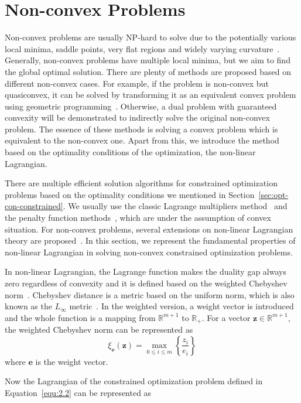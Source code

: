 \section{Non-convex Problems}
\label{sec:non-convex-sol}
Non-convex problems are usually NP-hard to solve due to the potentially various local minima, saddle points, very flat regions and widely varying curvature~\citep{DS:17}. Generally, non-convex problems have multiple local minima, but we aim to find the global optimal solution. There are plenty of methods are proposed based on different non-convex cases. For example, if the problem is non-convex but quasiconvex, it can be solved by transforming it as an equivalent convex problem using geometric programming~\citep{BS:07}. Otherwise, a dual problem with guaranteed convexity will be demonstrated to indirectly solve the original non-convex problem. The essence of these methods is solving a convex problem which is equivalent to the non-convex one. Apart from this, we introduce the method based on the optimality conditions of the optimization, the non-linear Lagrangian.  
\par There are multiple efficient solution algorithms for constrained optimization problems based on the optimality conditions we mentioned in Section~\ref{sec:opt-con-constrained}. We usually use the classic Lagrange multipliers method~\citep{BD:14} and the penalty function methods~\citep{CR:62}, which are under the assumption of convex situation. For non-convex problems, several extensions on non-linear Lagrangian theory are proposed~\cite{LD:95, LD:97, GC:97, XZ:97}. In this section, we represent the fundamental properties of non-linear Lagrangian in solving non-convex constrained optimization problems.
\par In non-linear Lagrangian, the Lagrange function makes the duality gap always zero regardless of convexity and it is defined based on the weighted Chebyshev norm~\citep{GC:97}. Chebyshev distance is a metric based on the  uniform norm, which is also known as the $L_\infty$ metric~\citep{CC:00}. In the weighted version, a weight vector is introduced and the whole function is a mapping from $\mathbb{R}^{m+1}$ to $\mathbb{R}_{+}$. For a vector $\mathbf{z} \in \mathbb{R}^{m+1}$, the weighted Chebyshev norm can be represented as
\begin{equation}
    \xi_{\mathbf{e}}(\mathbf{z})=\max _{0 \leq i \leq m}\left\{\frac{z_{i}}{e_{i}}\right\}
\end{equation}
where $\mathbf{e}$ is the weight vector. 
\par Now the Lagrangian of the constrained optimization problem defined in Equation~\ref{equ:2.2} can be represented as
